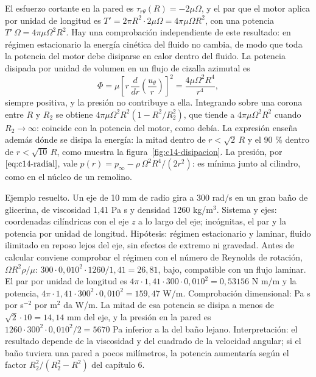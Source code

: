 \documentclass[10pt,openany]{book}
\begin{document}
El esfuerzo cortante en la pared es \(\tau_{r\theta}(R) = -2\mu\Omega\), y el par que el motor aplica por unidad de longitud es \(T' = 2\pi R^{2}\cdot 2\mu\Omega = 4\pi\mu\Omega R^{2}\), con una potencia \(T'\,\Omega = 4\pi\mu\Omega^{2}R^{2}\). Hay una comprobación independiente de este resultado: en régimen estacionario la energía cinética del fluido no cambia, de modo que toda la potencia del motor debe disiparse en calor dentro del fluido. La potencia disipada por unidad de volumen en un flujo de cizalla azimutal es
\begin{equation}
\Phi = \mu\left[r\,\frac{d}{dr}\!\left(\frac{u_\theta}{r}\right)\right]^{2} = \frac{4\mu\Omega^{2}R^{4}}{r^{4}}, \label{eq:c14-phi}
\end{equation}
siempre positiva, y la presión no contribuye a ella. Integrando sobre una corona entre \(R\) y \(R_2\) se obtiene \(4\pi\mu\Omega^{2}R^{2}\left(1 - R^{2}/R_2^{2}\right)\), que tiende a \(4\pi\mu\Omega^{2}R^{2}\) cuando \(R_2 \to \infty\): coincide con la potencia del motor, como debía. La expresión enseña además dónde se disipa la energía: la mitad dentro de \(r < \sqrt{2}\,R\) y el 90 \% dentro de \(r < \sqrt{10}\,R\), como muestra la figura~\ref{fig:c14-disipacion}. La presión, por \(\eqref{eq:c14-radial}\), vale \(p(r) = p_\infty - \rho\,\Omega^{2}R^{4}/(2r^{2})\): es mínima junto al cilindro, como en el núcleo de un remolino.

Ejemplo resuelto. Un eje de 10 mm de radio gira a 300 rad/s en un gran baño de glicerina, de viscosidad 1,41 Pa s y densidad 1260 kg/m\(^3\). Sistema y ejes: coordenadas cilíndricas con el eje \(z\) a lo largo del eje; incógnitas, el par y la potencia por unidad de longitud. Hipótesis: régimen estacionario y laminar, fluido ilimitado en reposo lejos del eje, sin efectos de extremo ni gravedad. Antes de calcular conviene comprobar el régimen con el número de Reynolds de rotación, \(\Omega R^{2}\rho/\mu\): \(300\cdot 0{,}010^2\cdot 1260/1{,}41 = 26{,}81\), bajo, compatible con un flujo laminar. El par por unidad de longitud es \(4\pi\cdot 1{,}41\cdot 300\cdot 0{,}010^2 = 0{,}53156\) N m/m y la potencia, \(4\pi\cdot 1{,}41\cdot 300^2\cdot 0{,}010^2 = 159{,}47\) W/m. Comprobación dimensional: Pa s por s\(^{-2}\) por m\(^2\) da W/m. La mitad de esa potencia se disipa a menos de \(\sqrt{2}\cdot 10 = 14{,}14\) mm del eje, y la presión en la pared es \(1260\cdot 300^2\cdot 0{,}010^2/2 = 5670\) Pa inferior a la del baño lejano. Interpretación: el resultado depende de la viscosidad y del cuadrado de la velocidad angular; si el baño tuviera una pared a pocos milímetros, la potencia aumentaría según el factor \(R_2^{2}/(R_2^{2} - R^{2})\) del capítulo 6.
\end{document}
